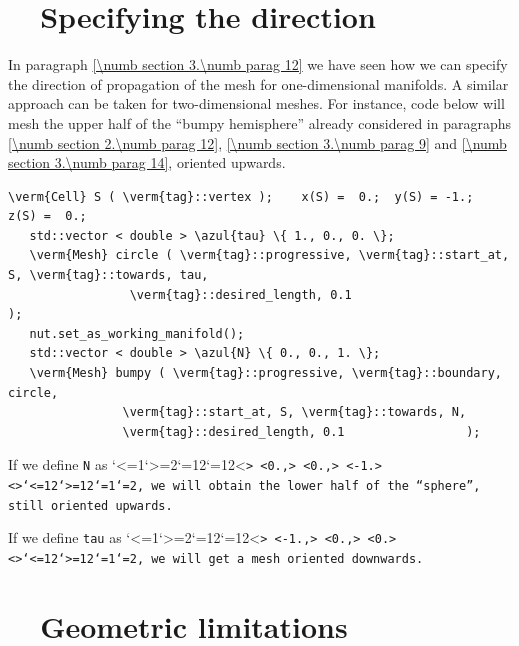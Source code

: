 \section{~~Specifying the direction}\label{\numb section 3.\numb parag 15}

In paragraph \ref{\numb section 3.\numb parag 12} we have seen how we can specify the direction
of propagation of the mesh for one-dimensional manifolds.
A similar approach can be taken for two-dimensional meshes.
For instance, code below will mesh the upper half of the ``bumpy hemisphere'' already considered
in paragraphs \ref{\numb section 2.\numb parag 12}, \ref{\numb section 3.\numb parag 9} and
\ref{\numb section 3.\numb parag 14}, oriented upwards.

\begin{Verbatim}[commandchars=\\\{\},formatcom=\small\tt,frame=single,
   label=parag-\ref{\numb section 3.\numb parag 15}.cpp,rulecolor=\color{coment},
   baselinestretch=0.94,framesep=2mm                                            ]
   \verm{Cell} S ( \verm{tag}::vertex );    x(S) =  0.;  y(S) = -1.;  z(S) =  0.;
   std::vector < double > \azul{tau} \{ 1., 0., 0. \};
   \verm{Mesh} circle ( \verm{tag}::progressive, \verm{tag}::start_at, S, \verm{tag}::towards, tau,
                 \verm{tag}::desired_length, 0.1                               );
   nut.set_as_working_manifold();
   std::vector < double > \azul{N} \{ 0., 0., 1. \};
   \verm{Mesh} bumpy ( \verm{tag}::progressive, \verm{tag}::boundary, circle,
                \verm{tag}::start_at, S, \verm{tag}::towards, N,
                \verm{tag}::desired_length, 0.1                 );
\end{Verbatim}

If we define {\small\tt N} as \catcode`<=1\catcode`>=2\catcode`{=12\catcode`}=12<\small\tt {>
<\small\tt 0.,> <\small\tt 0.,> <\small\tt -1.> <\small\tt }>\catcode`<=12\catcode`>=12\catcode`{=1\catcode`}=2, we will obtain
the lower half of the ``sphere'', still oriented upwards.

If we define {\small\tt tau} as \catcode`<=1\catcode`>=2\catcode`{=12\catcode`}=12<\small\tt {>
<\small\tt -1.,> <\small\tt 0.,> <\small\tt 0.> <\small\tt }>\catcode`<=12\catcode`>=12\catcode`{=1\catcode`}=2, we will get a mesh
oriented downwards.


\section{~~Geometric limitations}\label{\numb section 3.\numb parag 16}

